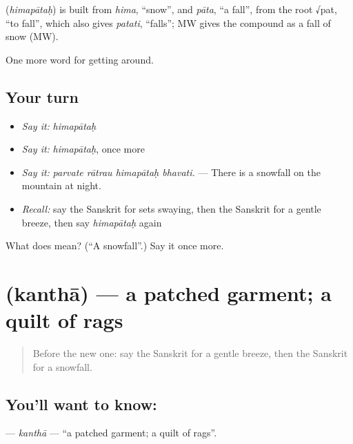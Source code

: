 \begin{cousinweb}
\textbf{} (\emph{himapātaḥ}) is built from \emph{hima}, \textquotedblleft{}snow\textquotedblright{}, and \emph{pāta}, \textquotedblleft{}a fall\textquotedblright{}, from the root √pat, \textquotedblleft{}to fall\textquotedblright{}, which also gives \emph{patati}, \textquotedblleft{}falls\textquotedblright{}; MW gives the compound as a fall of snow (MW).
\end{cousinweb}

\begin{grammarlens}[title={What you've built}]
One more word for getting around.
\end{grammarlens}

\subsection*{Your turn}
\begin{itemize}
\raggedright
  \item \emph{Say it:} \emph{himapātaḥ}
  \item \emph{Say it:} \emph{himapātaḥ}, once more
  \item \emph{Say it:} \emph{parvate rātrau himapātaḥ bhavati.} — There is a snowfall on the mountain at night.
  \item \emph{Recall:} say the Sanskrit for sets swaying, then the Sanskrit for a gentle breeze, then say \emph{himapātaḥ} again
\end{itemize}

\begin{tcolorbox}[breakable,colback=teal!4,colframe=teal!35!black,title={Before you move on}]
What does  mean? (\textquotedblleft{}A snowfall\textquotedblright{}.) Say it once more.
\end{tcolorbox}
\section[\texorpdfstring{\sk{कन्था} (kanthā)}{कन्था (kanthā)}]{ (kanthā) — a patched garment; a quilt of rags}

\label{lesson:SA-C440-kantha}



\begin{quote}
Before the new one: say the Sanskrit for a gentle breeze, then the Sanskrit for a snowfall.
\end{quote}

\subsection*{You'll want to know: }
\textbf{} — \emph{kanthā} — \textquotedblleft{}a patched garment; a quilt of rags\textquotedblright{}.


